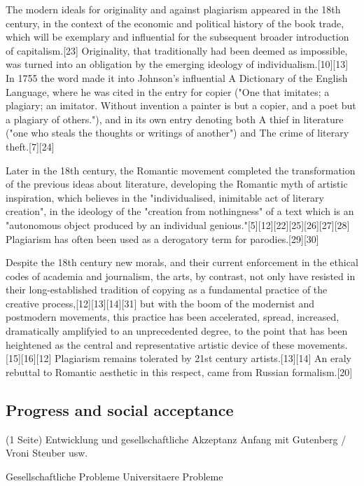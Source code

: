The modern ideals for originality and against plagiarism appeared in the 18th century, in the context of the economic and political history of the book trade, which will be exemplary and influential for the subsequent broader introduction of capitalism.[23] Originality, that traditionally had been deemed as impossible, was turned into an obligation by the emerging ideology of individualism.[10][13] In 1755 the word made it into Johnson's influential A Dictionary of the English Language, where he was cited in the entry for copier ("One that imitates; a plagiary; an imitator. Without invention a painter is but a copier, and a poet but a plagiary of others."), and in its own entry denoting both A thief in literature ("one who steals the thoughts or writings of another") and The crime of literary theft.[7][24]

Later in the 18th century, the Romantic movement completed the transformation of the previous ideas about literature, developing the Romantic myth of artistic inspiration, which believes in the "individualised, inimitable act of literary creation", in the ideology of the "creation from nothingness" of a text which is an "autonomous object produced by an individual genious."[5][12][22][25][26][27][28] Plagiarism has often been used as a derogatory term for parodies.[29][30]

Despite the 18th century new morals, and their current enforcement in the ethical codes of academia and journalism, the arts, by contrast, not only have resisted in their long-established tradition of copying as a fundamental practice of the creative process,[12][13][14][31] but with the boom of the modernist and postmodern movements, this practice has been accelerated, spread, increased, dramatically amplifyied to an unprecedented degree, to the point that has been heightened as the central and representative artistic device of these movements.[15][16][12] Plagiarism remains tolerated by 21st century artists.[13][14] An eraly rebuttal to Romantic aesthetic in this respect, came from Russian formalism.[20]
	
	
	
	

	\subsection{Progress and social acceptance} (1 Seite)
	Entwicklung und gesellschaftliche Akzeptanz
	Anfang mit Gutenberg / Vroni Steuber usw.

	Gesellschaftliche Probleme
	Universitaere Probleme
	
